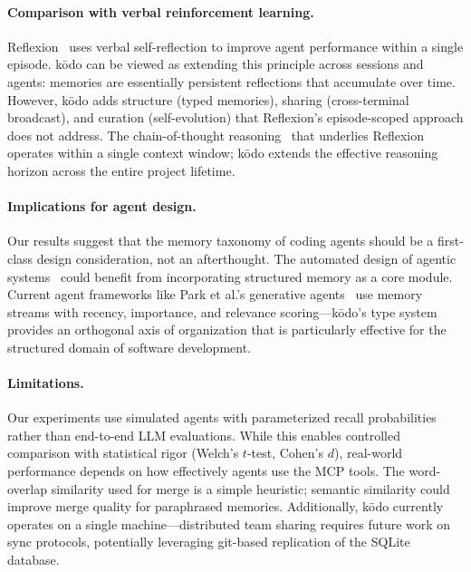 \documentclass{article}
\begin{document}
\paragraph{Comparison with verbal reinforcement learning.}
Reflexion~\cite{shinn2023reflexion} uses verbal self-reflection to improve agent performance within a single episode. k\=odo can be viewed as extending this principle across sessions and agents: memories are essentially persistent reflections that accumulate over time. However, k\=odo adds structure (typed memories), sharing (cross-terminal broadcast), and curation (self-evolution) that Reflexion's episode-scoped approach does not address. The chain-of-thought reasoning~\cite{wei2022chain} that underlies Reflexion operates within a single context window; k\=odo extends the effective reasoning horizon across the entire project lifetime.

\paragraph{Implications for agent design.}
Our results suggest that the memory taxonomy of coding agents should be a first-class design consideration, not an afterthought. The automated design of agentic systems~\cite{hu2024hiagent} could benefit from incorporating structured memory as a core module. Current agent frameworks like Park et al.'s generative agents~\cite{park2023generative} use memory streams with recency, importance, and relevance scoring---k\=odo's type system provides an orthogonal axis of organization that is particularly effective for the structured domain of software development.

\paragraph{Limitations.}
Our experiments use simulated agents with parameterized recall probabilities rather than end-to-end LLM evaluations. While this enables controlled comparison with statistical rigor (Welch's $t$-test, Cohen's $d$), real-world performance depends on how effectively agents use the MCP tools. The word-overlap similarity used for merge is a simple heuristic; semantic similarity could improve merge quality for paraphrased memories. Additionally, k\=odo currently operates on a single machine---distributed team sharing requires future work on sync protocols, potentially leveraging git-based replication of the SQLite database.

\end{document}
